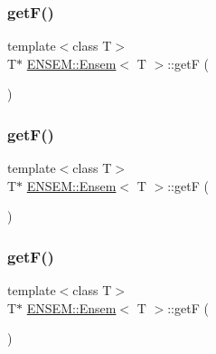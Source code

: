 \subsubsection{\texorpdfstring{getF()}{getF()}\hspace{0.1cm}{\footnotesize\ttfamily [4/6]}}
{\footnotesize\ttfamily template$<$class T$>$ \\
T$\ast$ \mbox{\hyperlink{classENSEM_1_1Ensem}{E\+N\+S\+E\+M\+::\+Ensem}}$<$ T $>$\+::getF (\begin{DoxyParamCaption}{ }\end{DoxyParamCaption})\hspace{0.3cm}{\ttfamily [inline]}}

\mbox{\label{classENSEM_1_1Ensem_ab2909a7d9b171d7e2ba7365c5e962aa6}} 
\subsubsection{\texorpdfstring{getF()}{getF()}\hspace{0.1cm}{\footnotesize\ttfamily [5/6]}}
{\footnotesize\ttfamily template$<$class T$>$ \\
T$\ast$ \mbox{\hyperlink{classENSEM_1_1Ensem}{E\+N\+S\+E\+M\+::\+Ensem}}$<$ T $>$\+::getF (\begin{DoxyParamCaption}{ }\end{DoxyParamCaption})\hspace{0.3cm}{\ttfamily [inline]}}

\mbox{\label{classENSEM_1_1Ensem_ab2909a7d9b171d7e2ba7365c5e962aa6}} 
\subsubsection{\texorpdfstring{getF()}{getF()}\hspace{0.1cm}{\footnotesize\ttfamily [6/6]}}
{\footnotesize\ttfamily template$<$class T$>$ \\
T$\ast$ \mbox{\hyperlink{classENSEM_1_1Ensem}{E\+N\+S\+E\+M\+::\+Ensem}}$<$ T $>$\+::getF (\begin{DoxyParamCaption}{ }\end{DoxyParamCaption})\hspace{0.3cm}{\ttfamily [inline]}}

